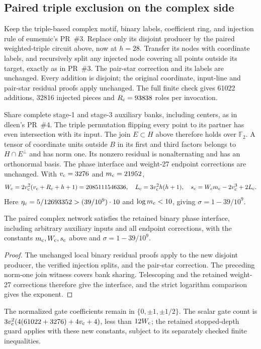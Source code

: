 \subsection{Paired triple exclusion on the complex side}
Keep the triple-based complex motif, binary labels, coefficient ring, and
injection rule of eumemic's PR~\#3. Replace only its disjoint producer by
the paired weighted-triple circuit above, now at $h=28$. Transfer its nodes
with coordinate labels, and recursively split any injected node covering
all points outside its target, exactly as in PR~\#3. The pair-star correction
and its labels are unchanged. Every addition is disjoint; the original
coordinate, input-line and pair-star residual proofs apply unchanged.
The full finite check gives 61022 additions, 32816 injected pieces and
$R_{\rm c}=93838$ roles per invocation.

Share complete stage-1 and stage-3 auxiliary banks, including centers, as
in dleen's PR~\#4. The triple permutation flipping every point to its partner
has even intersection with its input. The join $E\subset H$ above therefore
holds over $\mathbb F_2$. A tensor of coordinate units outside $B$ in its
first and third factors belongs to $H\cap E^\perp$ and has norm one.
Its nonzero residual is nonalternating and has an orthonormal basis.
The phase interface and weight-27 endpoint corrections are unchanged.
With $v_{\rm c}=3276$ and $m_{\rm c}=21952$,
\[
 W_{\rm c}=2v_{\rm c}^2(v_{\rm c}+R_{\rm c}+h+1)=2085111546336,
 \quad L_{\rm c}=3v_{\rm c}^2h(h+1),
 \quad s_{\rm c}=W_{\rm c}m_{\rm c}-2v_{\rm c}^3+2L_{\rm c}.
\]
Here $\eta_{\rm c}=5/12693352>(39/10^9)\cdot10$ and
$\log m_{\rm c}<10$, giving $\sigma=1-39/10^9$.
\begin{proposition}\label{prop:prime-field-complex-interface}
The paired complex network satisfies the retained binary phase interface,
including arbitrary auxiliary inputs and all endpoint corrections, with the
constants $m_{\rm c},W_{\rm c},s_{\rm c}$ above and $\sigma=1-39/10^9$.
\end{proposition}
\begin{proof}
The unchanged local binary residual proofs apply to the new disjoint
producer, the verified injection splits, and the pair-star correction.
The preceding norm-one join witness covers bank sharing. Telescoping and
the retained weight-27 corrections therefore give the interface, and the
strict logarithm comparison gives the exponent.
\end{proof}
The normalized gate coefficients remain in $\{0,\pm1,\pm1/2\}$.
The scalar gate count is $3v_{\rm c}^2(4(61022+3276)+4v_{\rm c}+4)$,
less than $12W_{\rm c}$; the retained stopped-depth guard applies with these
new constants, subject to its separately checked finite inequalities.

